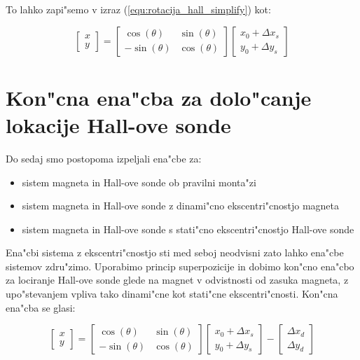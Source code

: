 To lahko zapi"semo v izraz (\ref{equ:rotacija_hall_simplify}) kot:

\begin{equation}
\label{equ:rotacija_hall_stat}
\begin{bmatrix} x\\y \end{bmatrix}=
\begin{bmatrix} \cos(\theta)&\sin(\theta)\\-\sin(\theta)&\cos(\theta) \end{bmatrix}
\begin{bmatrix} x_0+\Delta x_s\\y_0+\Delta y_s \end{bmatrix}
\end{equation}







\section{Kon"cna ena"cba za dolo"canje lokacije Hall-ove sonde}

Do sedaj smo postopoma izpeljali ena"cbe za:
\begin{itemize}
  \item sistem magneta in Hall-ove sonde ob pravilni monta"zi
  \item sistem magneta in Hall-ove sonde z dinami"cno ekscentri"cnostjo magneta
  \item sistem magneta in Hall-ove sonde s stati"cno ekscentri"cnostjo Hall-ove sonde
\end{itemize}

Ena"cbi sistema z ekscentri"cnostjo sti med seboj neodvisni zato lahko ena"cbe sistemov zdru"zimo. Uporabimo princip superpozicije in dobimo kon"cno ena"cbo za lociranje Hall-ove sonde glede na magnet v odvistnosti od zasuka magneta, z upo"stevanjem vpliva tako dinami"cne kot stati"cne ekscentri"cnosti. Kon"cna ena"cba se glasi:

\begin{equation}
\label{equ:rotacija_hall_koncna}
\begin{bmatrix} x\\y \end{bmatrix}=
\begin{bmatrix} \cos(\theta)&\sin(\theta)\\-\sin(\theta)&\cos(\theta) \end{bmatrix}
\begin{bmatrix} x_0+\Delta x_s\\y_0+\Delta y_s \end{bmatrix}-
\begin{bmatrix} \Delta x_d\\\Delta y_d \end{bmatrix}
\end{equation}


